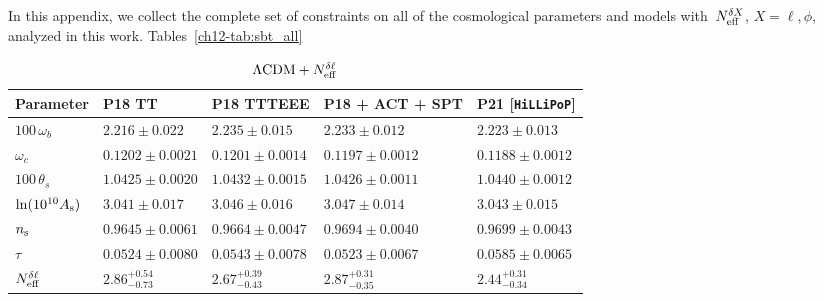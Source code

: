 \begin{subappendices}
In this appendix, we collect the complete set of constraints on all of the cosmological parameters and models with~$N_\mathrm{eff}^{\delta X}$, $X = \ell, \phi$, analyzed in this work. Tables~\ref{ch12-tab:sbt_all}%
\begin{table}
	\centering\small\setlength{\tabcolsep}{5pt}
	\begin{subtable}{\textwidth}
		\centering


		\begin{tabular}{l l l l l}
				\toprule
			Parameter			& P18 TT					& P18 TTTEEE				& P18 + ACT + SPT			& P21 [\texttt{HiLLiPoP}]	\\
				\midrule[0.065em]
			$100\,\omega_b$		& $2.216 \pm 0.022$			& $2.235 \pm 0.015$			& $2.233 \pm 0.012$			& $2.223 \pm 0.013$			\\
			$\omega_c$			& $0.1202 \pm 0.0021$		& $0.1201 \pm 0.0014$		& $0.1197 \pm 0.0012$		& $0.1188\pm 0.0012$		\\
			$100\,\theta_s$		& $1.0425 \pm 0.0020$		& $1.0432 \pm 0.0015$		& $1.0426 \pm 0.0011$		& $1.0440 \pm 0.0012$		\\
			$\ln(10^{10}A_\mathrm{s})$	& $3.041 \pm 0.017$			& $3.046 \pm 0.016$			& $3.047 \pm 0.014$			& $3.043 \pm 0.015$			\\
			$n_\mathrm{s}$				& $0.9645 \pm 0.0061$		& $0.9664 \pm 0.0047$		& $0.9694 \pm 0.0040$		& $0.9699 \pm 0.0043$		\\
			$\tau$				& $0.0524 \pm 0.0080$		& $0.0543 \pm 0.0078$		& $0.0523 \pm 0.0067$		& $0.0585 \pm 0.0065$		\\
			$N_\mathrm{eff}^{\delta\ell}$		& $2.86^{+0.54}_{-0.73}$	& $2.67^{+0.39}_{-0.43}$	& $2.87^{+0.31}_{-0.35}$	& $2.44^{+0.31}_{-0.34}$	\\
				\bottomrule
		\end{tabular}
	
		\caption{$\Lambda\mathrm{CDM} + N_\mathrm{eff}^{\delta\ell}$}
\end{subtable}\\[4pt]
	\begin{subtable}{\textwidth}
		\centering


\end{subtable}
\end{table}
\end{subappendices}
